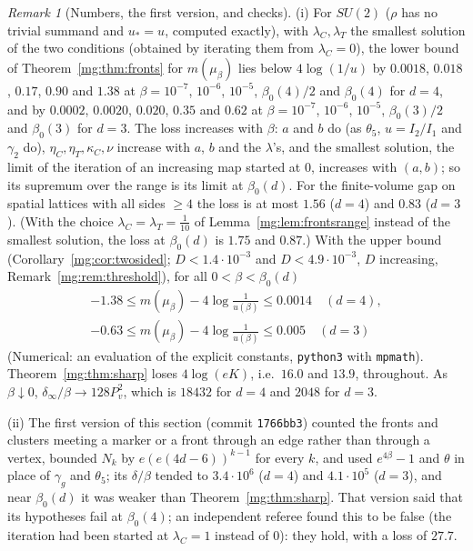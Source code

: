 \documentclass[11pt,a4paper]{article}
\theoremstyle{definition}
\theoremstyle{remark}
\newtheorem{remark}[theorem]{Remark}
\begin{document}
\begin{remark}[Numbers, the first version, and checks]\label{mg:rem:fronts}
(i) For $SU(2)$ ($\rho$ has no trivial summand and $u_*=u$, computed exactly), with $\lambda_C,\lambda_T$ the smallest solution of the two conditions
(obtained by iterating them from $\lambda_C=0$), the lower bound of Theorem~\ref{mg:thm:fronts} for $m(\mu_\beta)$ lies below $4\log(1/u)$ by
$0.0018$, $0.018$, $0.17$, $0.90$ and $1.38$ at $\beta=10^{-7}$, $10^{-6}$, $10^{-5}$, $\beta_0(4)/2$ and $\beta_0(4)$ for $d=4$, and by $0.0002$, $0.0020$,
$0.020$, $0.35$ and $0.62$ at $\beta=10^{-7}$, $10^{-6}$, $10^{-5}$, $\beta_0(3)/2$ and $\beta_0(3)$ for $d=3$. The loss increases with $\beta$: $a$ and $b$
do (as $\theta_5$, $u=I_2/I_1$ and $\gamma_2$ do), $\eta_C,\eta_T,\kappa_C,\nu$ increase with $a$, $b$ and the $\lambda$'s, and the smallest solution, the limit of the
iteration of an increasing map started at $0$, increases with $(a,b)$; so its supremum over the range is its limit at $\beta_0(d)$. For the finite-volume gap
on spatial lattices with all sides $\ge4$ the loss is at most $1.56$ ($d=4$) and $0.83$ ($d=3$). (With the choice $\lambda_C=\lambda_T=\frac1{10}$ of
Lemma~\ref{mg:lem:frontsrange} instead of the smallest solution, the loss at $\beta_0(d)$ is $1.75$ and $0.87$.) With the upper bound
(Corollary~\ref{mg:cor:twosided}; $D<1.4\cdot10^{-3}$ and $D<4.9\cdot10^{-3}$, $D$ increasing, Remark~\ref{mg:rem:threshold}), for all $0<\beta<\beta_0(d)$
\begin{gather*}
-1.38\le m(\mu_\beta)-4\log\frac1{u(\beta)}\le0.0014\quad(d=4),\\
-0.63\le m(\mu_\beta)-4\log\frac1{u(\beta)}\le0.005\quad(d=3)
\end{gather*}
(Numerical: an evaluation of the explicit constants, \texttt{python3} with \texttt{mpmath}). Theorem~\ref{mg:thm:sharp} loses $4\log(eK)$, i.e.\ $16.0$ and
$13.9$, throughout. As $\beta\downarrow0$, $\delta_\infty/\beta\to128P_v^2$, which is $18432$ for $d=4$ and $2048$ for $d=3$.

(ii) The first version of this section (commit \texttt{1766bb3}) counted the fronts and clusters meeting a marker or a front through an edge rather than
through a vertex, bounded $N_k$ by $e(e(4d-6))^{k-1}$ for every $k$, and used $e^{4\beta}-1$ and $\theta$ in place of $\gamma_g$ and $\theta_5$; its
$\delta/\beta$ tended to $3.4\cdot10^6$ ($d=4$) and $4.1\cdot10^5$ ($d=3$), and near $\beta_0(d)$ it was weaker than Theorem~\ref{mg:thm:sharp}. That version
said that its hypotheses fail at $\beta_0(4)$; an independent referee found this to be false (the iteration had been started at $\lambda_C=1$ instead of
$0$): they hold, with a loss of $27.7$.


\end{remark}
\end{document}
